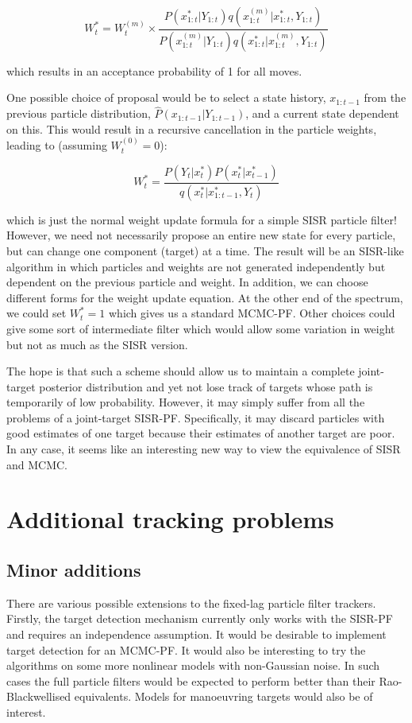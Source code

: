 \begin{equation}
W_t^{*} = W_t^{(m)} \times \frac{P(x_{1:t}^{*}|Y_{1:t})q(x_{1:t}^{(m)}|x_{1:t}^{*}, Y_{1:t})}{P(x_{1:t}^{(m)}|Y_{1:t})q(x_{1:t}^{*}|x_{1:t}^{(m)}, Y_{1:t})}
\end{equation}

which results in an acceptance probability of 1 for all moves.

One possible choice of proposal would be to select a state history, $x_{1:t-1}$ from the previous particle distribution, $\hat{P}(x_{1:t-1}|Y_{1:t-1})$, and a current state dependent on this. This would result in a recursive cancellation in the particle weights, leading to (assuming $W_t^{(0)}=0$):

\begin{equation}
W_t^{*} = \frac{P(Y_t|x_t^{*})P(x_t^{*}|x_{t-1}^{*})}{q(x_{t}^{*}|x_{1:t-1}^{*}, Y_{t})}
\end{equation}

which is just the normal weight update formula for a simple SISR particle filter! However, we need not necessarily propose an entire new state for every particle, but can change one component (target) at a time. The result will be an SISR-like algorithm in which particles and weights are not generated independently but dependent on the previous particle and weight. In addition, we can choose different forms for the weight update equation. At the other end of the spectrum, we could set $W_t^{*}=1$ which gives us a standard MCMC-PF. Other choices could give some sort of intermediate filter which would allow some variation in weight but not as much as the SISR version.

The hope is that such a scheme should allow us to maintain a complete joint-target posterior distribution and yet not lose track of targets whose path is temporarily of low probability. However, it may simply suffer from all the problems of a joint-target SISR-PF. Specifically, it may discard particles with good estimates of one target because their estimates of another target are poor. In any case, it seems like an interesting new way to view the equivalence of SISR and MCMC.



\section{Additional tracking problems}

\subsection{Minor additions}
There are various possible extensions to the fixed-lag particle filter trackers. Firstly, the target detection mechanism currently only works with the SISR-PF and requires an independence assumption. It would be desirable to implement target detection for an MCMC-PF. It would also be interesting to try the algorithms on some more nonlinear models with non-Gaussian noise. In such cases the full particle filters would be expected to perform better than their Rao-Blackwellised equivalents. Models for manoeuvring targets would also be of interest.

